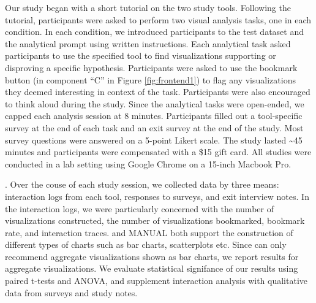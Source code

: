 Our study began with a short tutorial on the two study tools.
Following the tutorial, participants were asked to perform two visual analysis 
tasks, one in each condition.
In each condition, we introduced participants to the test dataset
and the analytical prompt using written instructions.
Each analytical task asked participants to use the specified tool to find 
visualizations supporting or disproving a specific hypothesis.
Participants were asked to use the bookmark button (in component ``C'' in Figure 
\ref{fig:frontend1}) to flag any visualizations they deemed interesting in
context of the task.
Participants were also encouraged to think aloud during the study.
Since the analytical tasks were open-ended, we capped each analysis session at 8 minutes.
Participants filled out a tool-specific survey at the end of each task and
an exit survey at the end of the study.
Most survey questions were answered on a 5-point Likert scale.
The study lasted \textasciitilde 45 minutes and participants were compensated 
 with a \$15 gift card.
All studies were conducted in a lab setting using Google Chrome on a 15-inch 
Macbook Pro.

.
Over the couse of each study session, we collected data by three means: interaction logs 
from each tool, responses to surveys, and exit interview notes.
In the interaction logs, we were particularly concerned with the number of visualizations
constructed, the number of visualizations bookmarked, bookmark rate, and interaction traces.
\SeeDB and MANUAL both support the construction of different types of charts such as bar 
charts, scatterplots etc.
Since \SeeDB can only recommend aggregate visualizations shown as bar charts,
we report results for aggregate visualizations.
We evaluate statistical signifance of our results using paired t-tests and ANOVA,
and supplement interaction analysis with qualitative data from surveys and study notes.



